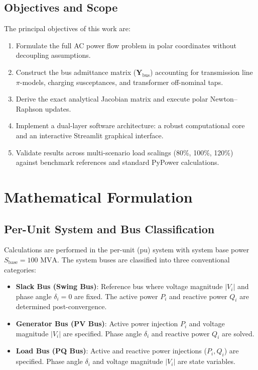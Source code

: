 ﻿\documentclass[conference,10pt]{IEEEtran}
\begin{document}
\subsection{Objectives and Scope}
The principal objectives of this work are:
\begin{enumerate}
    \item Formulate the full AC power flow problem in polar coordinates without decoupling assumptions.
    \item Construct the bus admittance matrix ($\mathbf{Y}_{\text{bus}}$) accounting for transmission line $\pi$-models, charging susceptances, and transformer off-nominal taps.
    \item Derive the exact analytical Jacobian matrix and execute polar Newton--Raphson updates.
    \item Implement a dual-layer software architecture: a robust computational core and an interactive Streamlit graphical interface.
    \item Validate results across multi-scenario load scalings (80\%, 100\%, 120\%) against benchmark references and standard PyPower calculations.
\end{enumerate}

\section{Mathematical Formulation}

\subsection{Per-Unit System and Bus Classification}
Calculations are performed in the per-unit (pu) system with system base power $S_{\text{base}} = 100\text{ MVA}$. The system buses are classified into three conventional categories:
\begin{itemize}
    \item \textbf{Slack Bus (Swing Bus)}: Reference bus where voltage magnitude $|V_i|$ and phase angle $\delta_i = 0$ are fixed. The active power $P_i$ and reactive power $Q_i$ are determined post-convergence.
    \item \textbf{Generator Bus (PV Bus)}: Active power injection $P_i$ and voltage magnitude $|V_i|$ are specified. Phase angle $\delta_i$ and reactive power $Q_i$ are solved.
    \item \textbf{Load Bus (PQ Bus)}: Active and reactive power injections ($P_i, Q_i$) are specified. Phase angle $\delta_i$ and voltage magnitude $|V_i|$ are state variables.
\end{itemize}
\end{document}

